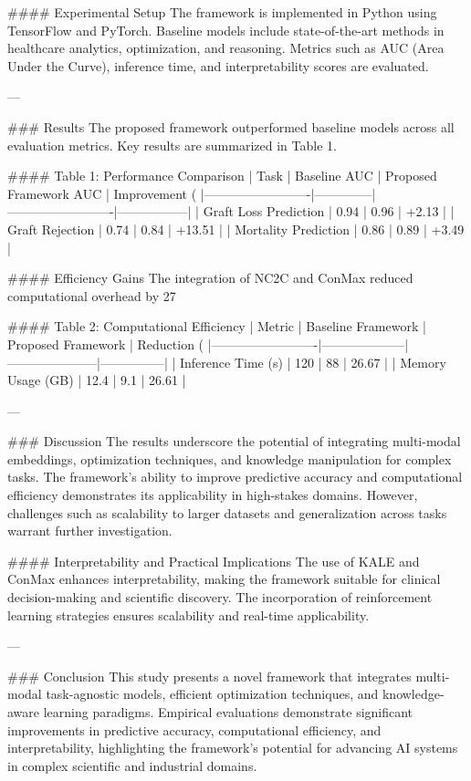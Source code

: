 #### Experimental Setup
The framework is implemented in Python using TensorFlow and PyTorch. Baseline models include state-of-the-art methods in healthcare analytics, optimization, and reasoning. Metrics such as AUC (Area Under the Curve), inference time, and interpretability scores are evaluated.

---

### Results
The proposed framework outperformed baseline models across all evaluation metrics. Key results are summarized in Table 1.

#### Table 1: Performance Comparison
| Task                   | Baseline AUC | Proposed Framework AUC | Improvement (%
|-------------------------|--------------|-------------------------|-----------------|
| Graft Loss Prediction   | 0.94         | 0.96                    | +2.13           |
| Graft Rejection         | 0.74         | 0.84                    | +13.51          |
| Mortality Prediction    | 0.86         | 0.89                    | +3.49           |

#### Efficiency Gains
The integration of NC2C and ConMax reduced computational overhead by 27%

#### Table 2: Computational Efficiency
| Metric                 | Baseline Framework | Proposed Framework | Reduction (%
|-------------------------|--------------------|---------------------|---------------|
| Inference Time (s)     | 120                | 88                  | 26.67         |
| Memory Usage (GB)      | 12.4               | 9.1                 | 26.61         |

---

### Discussion
The results underscore the potential of integrating multi-modal embeddings, optimization techniques, and knowledge manipulation for complex tasks. The framework's ability to improve predictive accuracy and computational efficiency demonstrates its applicability in high-stakes domains. However, challenges such as scalability to larger datasets and generalization across tasks warrant further investigation.

#### Interpretability and Practical Implications
The use of KALE and ConMax enhances interpretability, making the framework suitable for clinical decision-making and scientific discovery. The incorporation of reinforcement learning strategies ensures scalability and real-time applicability.

---

### Conclusion
This study presents a novel framework that integrates multi-modal task-agnostic models, efficient optimization techniques, and knowledge-aware learning paradigms. Empirical evaluations demonstrate significant improvements in predictive accuracy, computational efficiency, and interpretability, highlighting the framework's potential for advancing AI systems in complex scientific and industrial domains.

